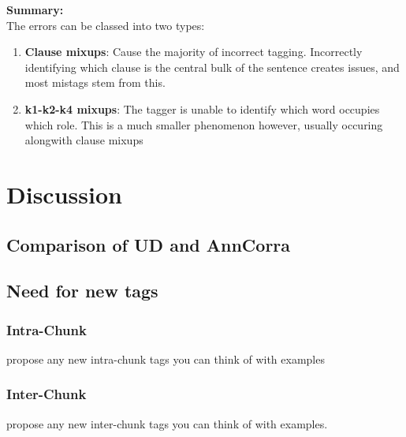 \documentclass[a4 paper]{article}
\begin{document}
\textbf{Summary:}\\
The errors can be classed into two types:
\begin{enumerate}
    \item \textbf{Clause mixups}: Cause the majority of incorrect tagging. 
        Incorrectly identifying which clause is the central bulk of the sentence
        creates issues, and most mistags stem from this.
    \item \textbf{k1-k2-k4 mixups}: The tagger is unable to identify  which
        word occupies which role. This is a much smaller phenomenon however, 
        usually occuring alongwith clause mixups
\end{enumerate}

\section{Discussion}

\subsection{Comparison of UD and AnnCorra}
\subsection{Need for new tags}
\subsubsection{Intra-Chunk}
propose any new intra-chunk tags you can think of with examples
\subsubsection{Inter-Chunk}
propose any new inter-chunk tags you can think of with examples.
\end{document}
